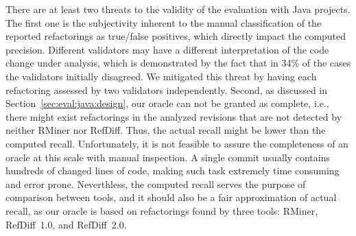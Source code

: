 There are at least two threats to the validity of the evaluation with Java projects.
The first one is the subjectivity inherent to the manual classification of the reported refactorings as true/false positives, which directly impact the computed precision.
Different validators may have a different interpretation of the code change under analysis, which is demonstrated by the fact that in 34\% of the cases the validators initially disagreed.
We mitigated this threat by having each refactoring assessed by two validators independently.
Second, as discussed in Section~\ref{sec:eval:java:design}, our oracle can not be granted as complete, i.e., there might exist refactorings in the analyzed revisions that are not detected by neither RMiner nor RefDiff.
Thus, the actual recall might be lower than the computed recall.
Unfortunately, it is not feasible to assure the completeness of an oracle at this scale with manual inspection.
A single commit usually contains hundreds of changed lines of code, making such task extremely time consuming and error prone.
Neverthless, the computed recall serves the purpose of comparison between tools, and it should also be a fair approximation of actual recall, as our oracle is based on refactorings found by three tools: RMiner, RefDiff~1.0, and RefDiff~2.0.

